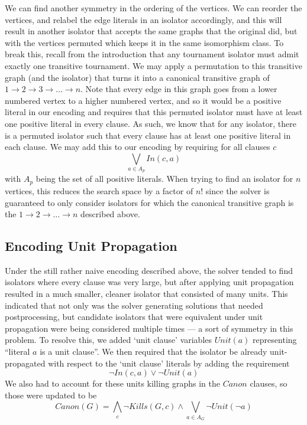 \documentclass[a4paper,UKenglish,cleveref, autoref, thm-restate]{lipics-v2021}
\begin{document}
We can find another symmetry in the ordering of the vertices.  We can reorder the vertices, and relabel the edge literals in an isolator accordingly, and this will result in another isolator that accepts the same graphs that the original did, but with the vertices permuted which keeps it in the same isomorphism class.  To break this, recall from the introduction that any tournament isolator must admit exactly one transitive tournament.  We may apply a permutation to this transitive graph (and the isolator) that turns it into a canonical transitive graph of $1 \to 2 \to 3 \to \dots \to n$.  Note that every edge in this graph goes from a lower numbered vertex to a higher numbered vertex, and so it would be a positive literal in our encoding and requires that this permuted isolator must have at least one positive literal in every clause.  As such, we know that for any isolator, there is a permuted isolator such that every clause has at least one positive literal in each clause.  We may add this to our encoding by requiring for all clauses $c$
$$\bigvee_{a \in A_p} In(c, a)$$
with $A_p$ being the set of all positive literals.    When trying to find an isolator for $n$ vertices, this reduces the search space by a factor of $n!$ since the solver is guaranteed to only consider isolators for which the canonical transitive graph is the $1 \to 2 \to \dots \to n$ described above.

\subsection{Encoding Unit Propagation}

Under the still rather naive encoding described above, the solver tended to find isolators where every clause was very large, but after applying unit propagation resulted in a much smaller, cleaner isolator that consisted of many units.  This indicated that not only was the solver generating solutions that needed postprocessing, but candidate isolators that were equivalent under unit propagation were being considered multiple times --- a sort of symmetry in this problem.  To resolve this, we added `unit clause' variables $Unit(a)$ representing ``literal $a$ is a unit clause''. We then required that the isolator be already unit-propagated with respect to the `unit clause' literals by adding the requirement
$$\lnot In(c, a) \lor \lnot Unit(a)$$
We also had to account for these units killing graphs in the $Canon$ clauses, so those were updated to be
$$Canon(G) = \bigwedge\limits_c \lnot Kills(G,c) \land \bigvee\limits_{a \in A_G}\lnot Unit(\lnot a)$$
\end{document}
